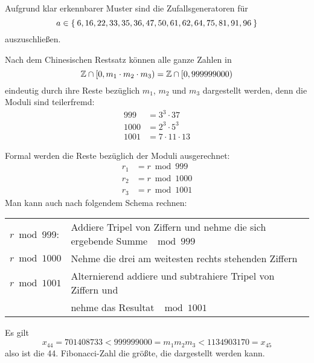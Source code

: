 \documentclass[a4paper,11pt]{article}             %
\begin{document}
\setcounter{excnt}{5}
\begin{ex}
\begin{exlist}
  \leavevmode
  \setcounter{exlisti}{2}
  \item
Aufgrund klar erkennbarer Muster sind die Zufallsgeneratoren für
\begin{equation*}
a\in\Set{6,16,22,33,35,36,47,50,61,62,64,75,81,91,96}
\end{equation*}
 auszuschließen.
\end{exlist}
\end{ex}
\begin{ex}
\begin{exlist}
  \setcounter{exlisti}{2}
  \leavevmode
  \item 
    \begin{exlist}
\item Nach dem Chinesischen Restsatz können alle ganze Zahlen in 
\begin{equation*}
\mathbb{Z}\cap [0,
  m_1\cdot m_2\cdot m_3)=\mathbb{Z}\cap[0, 999999000)
  \end{equation*}
  eindeutig durch ihre Reste bezüglich $m_1$, $m_2$ und $m_3$ dargestellt
  werden, denn die Moduli sind teilerfremd:
\begin{align*}
999 &= 3^3\cdot 37 \\
1000 &= 2^3\cdot 5^3 \\
1001 &= 7 \cdot 11\cdot 13 
\end{align*}
\item Formal werden die Reste bezüglich der Moduli ausgerechnet:
\begin{align*}
  r_1&=r\bmod 999 \\
r_2&=r\bmod1000 \\
r_3 &= r\bmod1001
  \end{align*}
  Man kann auch nach folgendem Schema rechnen:
  \begin{table}[h!]
    \centering
\begin{tabular}{l l}
  $r\bmod 999$: & Addiere Tripel von Ziffern und nehme die sich ergebende Summe $\mod 999$ \\
$r\bmod 1000$ & Nehme die drei am weitesten rechts stehenden Ziffern \\
$r\bmod 1001$ & Alternierend addiere und subtrahiere Tripel von Ziffern und \\ &nehme das Resultat $\mod 1001$
  \end{tabular}
  \end{table}
  \item Es gilt
    \begin{equation*}
x_{44} = 701408733<999999000=m_1m_2m_3<1134903170=x_{45}
\end{equation*}
also ist die 44. Fibonacci-Zahl die größte, die dargestellt werden kann.
\end{exlist}
\end{exlist}
\end{ex}
\end{document}

